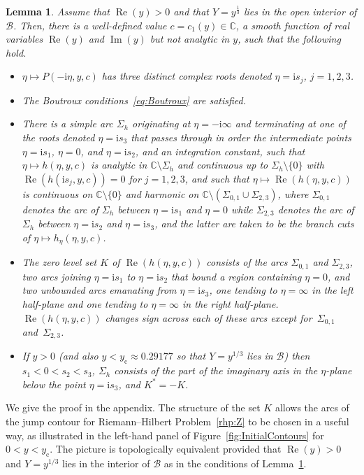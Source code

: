 \documentclass[11pt]{article}
\numberwithin{equation}{section}
\numberwithin{equation}{section}
\newtheorem{Lemma}[Theorem]{Lemma}
\begin{document}
\begin{Lemma}\label{lem:h}
Assume that $\operatorname{Re}(y)>0$ and that $Y=y^\frac{1}{3}$ lies in the open interior of $\mathcal{B}$. Then, there is a well-defined value $c=c_1(y)\in\mathbb{C}$, a smooth function of real variables $\operatorname{Re}(y)$ and $\operatorname{Im}(y)$ but not analytic in $y$, such that the
following hold.
\begin{itemize}\itemsep=0pt
\item $\eta\mapsto P(-\mathrm{i}\eta,y,c)$ has three distinct complex roots denoted $\eta=\mathrm{i} s_j$, $j=1,2,3$.
\item The Boutroux conditions~\eqref{eq:Boutroux} are satisfied.
\item There is a simple arc $\Sigma_h$ originating at $\eta=-\mathrm{i}\infty$ and terminating at one of the roots denoted $\eta=\mathrm{i} s_3$ that passes through in order the intermediate points $\eta=\mathrm{i} s_1$, $\eta=0$, and $\eta=\mathrm{i} s_2$, and an integration constant, such that $\eta\mapsto h(\eta,y,c)$ is analytic in $\mathbb{C}\setminus\Sigma_h$ and continuous up to $\Sigma_h\setminus\{0\}$
with
$\operatorname{Re}(h(\mathrm{i} s_j,y,c))=0$ for $j=1,2,3$, and such that $\eta\mapsto \operatorname{Re}(h(\eta,y,c))$ is continuous on $\mathbb{C}\setminus\{0\}$ and harmonic on $\mathbb{C}\setminus (\Sigma_{0,1}\cup\Sigma_{2,3})$, where $\Sigma_{0,1}$ denotes the arc of $\Sigma_h$ between $\eta=\mathrm{i} s_1$ and $\eta=0$ while $\Sigma_{2,3}$ denotes the arc of $\Sigma_h$ between $\eta=\mathrm{i} s_2$ and $\eta=\mathrm{i} s_3$, and the latter are taken to be the branch cuts of $\eta\mapsto h_\eta(\eta,y,c)$.
\item The zero level set $K$ of $\operatorname{Re}(h(\eta,y,c))$ consists of the arcs $\Sigma_{0,1}$ and $\Sigma_{2,3}$, two arcs joining $\eta=\mathrm{i} s_1$ to $\eta=\mathrm{i} s_2$ that bound a region containing $\eta=0$, and two unbounded arcs emanating from $\eta=\mathrm{i} s_3$, one tending to $\eta=\infty$ in the left half-plane and one tending to $\eta=\infty$ in the right half-plane. $\operatorname{Re}(h(\eta,y,c))$ changes sign across each of these arcs except for~$\Sigma_{0,1}$ and~$\Sigma_{2,3}$.
\item If $y>0$ \big(and also $y<y_\mathrm{c}\approx 0.29177$ so that $Y=y^{1/3}$ lies in $\mathcal{B}$\big) then $s_1<0<s_2<s_3$, $\Sigma_h$ consists of the part of the imaginary axis in the $\eta$-plane below the point $\eta=\mathrm{i} s_3$, and $K^*=-K$.
\end{itemize}
\end{Lemma}
We give the proof in the appendix. The structure of the set $K$ allows the arcs of the jump contour for Riemann--Hilbert Problem~\ref{rhp:Z} to be chosen in a useful way, as illustrated in the left-hand panel of Figure~\ref{fig:InitialContours} for $0<y<y_\mathrm{c}$.
The picture is topologically equivalent provided that $\operatorname{Re}(y)>0$ and $Y=y^{1/3}$ lies in the interior of $\mathcal{B}$ as in the conditions of Lemma~\ref{lem:h}.
\end{document}
